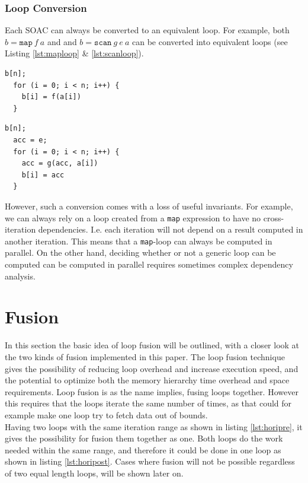\documentclass[11pt]{article}
\begin{document}
\subsubsection{Loop Conversion}
Each SOAC can always be converted to an equivalent loop. For example, both $b = \mathtt{map} \: f \: a$ and
and $b = \mathtt{scan} \: g \: e \: a$ can be converted into equivalent loops (see Listing \ref{lst:maploop} \& \ref{lst:scanloop}).
\begin{lstlisting}[caption=\texttt{map} as a loop., label={lst:maploop}]
  b[n];
  for (i = 0; i < n; i++) {
    b[i] = f(a[i])
  }
\end{lstlisting}
\begin{lstlisting}[caption=\texttt{scan} as a loop., label={lst:scanloop}]
  b[n];
  acc = e;
  for (i = 0; i < n; i++) {
    acc = g(acc, a[i])
    b[i] = acc
  }
\end{lstlisting}

However, such a conversion comes with a loss of useful invariants. For example, we can always rely on a loop created from a \texttt{map} expression to have no cross-iteration
 dependencies. I.e. each iteration will not depend on a result computed in another iteration. This means that a \texttt{map}-loop can always be computed in parallel. On the other hand,
 deciding whether or not a generic loop can be computed can be computed in parallel requires sometimes complex dependency analysis.

\section{Fusion}
In this section the basic idea of loop fusion will be outlined, with a closer look at the two kinds of fusion implemented in this paper.
The loop fusion technique gives the possibility of reducing loop overhead and increase execution speed, and the potential to optimize both the memory hierarchy time overhead and space requirements. Loop fusion is as the name implies, fusing loops together. However this requires that the loops iterate the same number of times, as that could for example make one loop try to fetch data out of bounds. \\

Having two loops with the same iteration range as shown in listing \ref{lst:horipre}, it gives the possibility for fusion them together as one. Both loops do the work needed within the same range, and therefore it could be done in one loop as shown in listing \ref{lst:horipost}. Cases where fusion will not be possible regardless of two equal length loops, will be shown later on.
\end{document}
